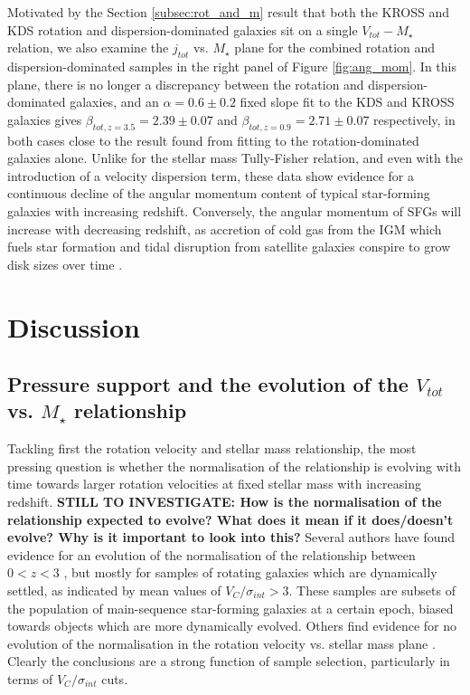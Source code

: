 \documentclass[fleqn,usenatbib]{mnras}
\begin{document}
\noindent
Motivated by the Section \ref{subsec:rot_and_m} result that both the KROSS and KDS rotation and dispersion-dominated galaxies sit on a single $V_{tot}-M_{\star}$ relation, we also examine the $j_{tot}$ vs. $M_{\star}$ plane for the combined rotation and dispersion-dominated samples in the right panel of Figure \ref{fig:ang_mom}.
In this plane, there is no longer a discrepancy between the rotation and dispersion-dominated galaxies, and an $\alpha=0.6\pm0.2$ fixed slope fit to the KDS and KROSS galaxies gives $\beta_{tot,z=3.5} = 2.39\pm0.07$ and $\beta_{tot,z=0.9} = 2.71\pm0.07$ respectively, in both cases close to the result found from fitting to the rotation-dominated galaxies alone.
Unlike for the stellar mass Tully-Fisher relation, and even with the introduction of a velocity dispersion term, these data show evidence for a  continuous decline of the angular momentum content of typical star-forming galaxies with increasing redshift.
Conversely, the angular momentum of SFGs will increase with decreasing redshift, as accretion of cold gas from the IGM which fuels star formation and tidal disruption from satellite galaxies conspire to grow disk sizes over time \citep{Trujillo2007,Buitrago2008,VanderWel2014a}.

\section{Discussion}\label{sec:discussion}
\subsection{Pressure support and the evolution of the $V_{tot}$ vs. $M_{\star}$ relationship}\label{subsec:tf_discussion}
Tackling first the rotation velocity and stellar mass relationship, the most pressing question is whether the normalisation of the relationship is evolving with time towards larger rotation velocities at fixed stellar mass with increasing redshift.
\textbf{STILL TO INVESTIGATE: How is the normalisation of the relationship expected to evolve? What does it mean if it does/doesn't evolve? Why is it important to look into this?}
Several authors have found evidence for an evolution of the normalisation of the relationship between $0 < z < 3$ \citep[e.g.][]{Puech2008,Cresci2009,Gnerucci2011,Simons2016,Tiley2016,Straatman2017,Ubler2017}, but mostly for samples of rotating galaxies which are dynamically settled, as indicated by mean values of $V_{C}/\sigma_{int} > 3$.
These samples are subsets of the population of main-sequence star-forming galaxies at a certain epoch, biased towards objects which are more dynamically evolved. 
Others find evidence for no evolution of the normalisation in the rotation velocity vs. stellar mass plane \citep[e.g.][]{Flores2006,Miller2011,Kassin2012,Miller2012,Vergani2012,Miller2014,Contini2015a,DiTeodoro2016,Pelliccia2017,Molina2017,Harrison2017}. 
Clearly the conclusions are a strong function of sample selection, particularly in terms of $V_{C}/\sigma_{int}$ cuts. \\
\end{document}
